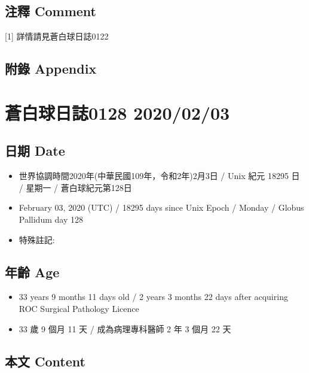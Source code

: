 \documentclass[a5paper, 12pt
]{book}
\providecommand{\tightlist}{%
  \setlength{\itemsep}{0pt}\setlength{\parskip}{0pt}}
\begin{document}
\hypertarget{ux6ce8ux91cb-comment-62}{%
\subsection{注釋 Comment}\label{ux6ce8ux91cb-comment-62}}

{[}1{]} 詳情請見蒼白球日誌0122

\hypertarget{ux9644ux9304-appendix-63}{%
\subsection{附錄 Appendix}\label{ux9644ux9304-appendix-63}}

\hypertarget{ux84bcux767dux7403ux65e5ux8a8c0128-20200203}{%
\section{蒼白球日誌0128
2020/02/03}\label{ux84bcux767dux7403ux65e5ux8a8c0128-20200203}}

\hypertarget{ux65e5ux671f-date-64}{%
\subsection{日期 Date}\label{ux65e5ux671f-date-64}}

\begin{itemize}
\tightlist
\item
  世界協調時間2020年(中華民國109年，令和2年)2月3日 / Unix 紀元 18295 日
  / 星期一 / 蒼白球紀元第128日
\item
  February 03, 2020 (UTC) / 18295 days since Unix Epoch / Monday /
  Globus Pallidum day 128
\item
  特殊註記:
\end{itemize}

\hypertarget{ux5e74ux9f61-age-64}{%
\subsection{年齡 Age}\label{ux5e74ux9f61-age-64}}

\begin{itemize}
\tightlist
\item
  33 years 9 months 11 days old / 2 years 3 months 22 days after
  acquiring ROC Surgical Pathology Licence
\item
  33 歲 9 個月 11 天 / 成為病理專科醫師 2 年 3 個月 22 天
\end{itemize}

\hypertarget{ux672cux6587-content-64}{%
\subsection{本文 Content}\label{ux672cux6587-content-64}}
\end{document}

